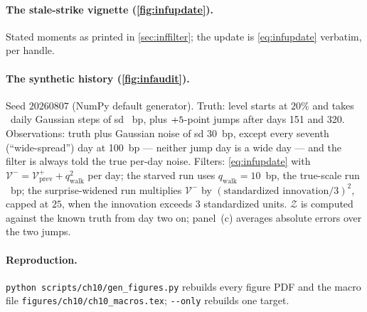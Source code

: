 \paragraph{The stale-strike vignette (\cref{fig:infupdate}).}
Stated moments as printed in \cref{sec:inffilter}; the update is
\cref{eq:infupdate} verbatim, per handle.

\paragraph{The synthetic history (\cref{fig:infaudit}).}
Seed $20260807$ (NumPy default generator).  Truth: level starts at
$20\%$ and takes \MacFiltAuditDays\ daily Gaussian steps of sd
\MacFiltAuditQTrueBp\ bp, plus $+5$-point jumps
after days 151 and 320.  Observations: truth plus Gaussian noise of
sd 30~bp, except every seventh (``wide-spread'') day at 100~bp ---
neither jump day is a wide day --- and the filter is always told the
true per-day noise.  Filters: \cref{eq:infupdate} with
$\mathcal{V}^{-}=\mathcal{V}^{+}_{\mathrm{prev}}+q_{\mathrm{walk}}^2$
per day; the starved run uses $q_{\mathrm{walk}}=10$~bp, the
true-scale run \MacFiltAuditQTrueBp~bp; the surprise-widened run multiplies
$\mathcal{V}^{-}$ by $(\text{standardized innovation}/3)^2$, capped
at $25$, when the innovation exceeds $3$ standardized units.
$\mathcal{Z}$ is computed against the known truth from day two on;
panel~(c) averages absolute errors over the two jumps.

\paragraph{Reproduction.}
\texttt{python scripts/ch10/gen\_figures.py} rebuilds every figure
PDF and the macro file \texttt{figures/ch10/ch10\_macros.tex};
\texttt{-{}-only} rebuilds one target.
